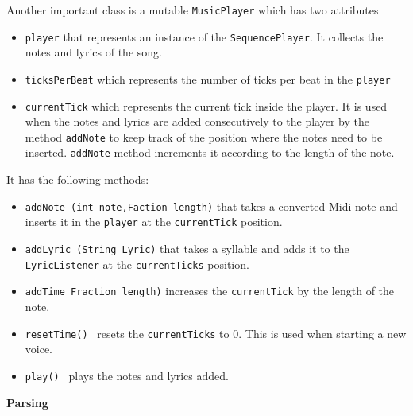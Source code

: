 \documentclass[12pt]{book}
\begin{document}
\bigskip
Another important class is a mutable {\tt MusicPlayer} which has two attributes 
\begin{itemize} 
\item { \tt player} that represents an instance of the {\tt SequencePlayer}. It collects the notes and lyrics of the song.
\item { \tt ticksPerBeat} which represents the number of ticks per beat in the {\tt player}
\item { \tt currentTick} which represents the current tick inside the player. It is used when the notes and lyrics are added consecutively to the player by the method {\tt addNote} to keep track of the position  where the notes need to be inserted. {\tt addNote} method increments it according to the length of the note.
\end{itemize}
It has the following methods:
\begin{itemize} 
\item { \tt addNote (int note,Faction length)} that takes a converted Midi note and inserts it in the {\tt player} at the {\tt currentTick} position.
\item { \tt addLyric (String Lyric)} that takes a syllable and adds it to the {\tt LyricListener} at the {\tt currentTicks} position.
\item { \tt addTime Fraction length)} increases the {\tt currentTick} by the length of the note.
\item { \tt resetTime() } resets the {\tt currentTicks} to 0. This is used when starting a new voice.
\item { \tt play() } plays the notes and lyrics added.
\end{itemize}


\centerline{{\large \bf Parsing }}
\end{document}
